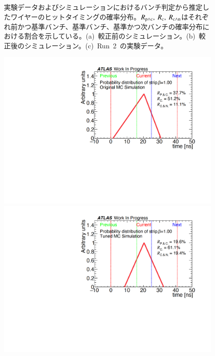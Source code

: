 \begin{figure}[H]
\begin{minipage}{0.33\hsize}
    \subcaption{}
    \end{minipage}
    \caption[実験データおよびシミュレーションにおけるバンチ判定から推定したワイヤーのヒットタイミングの確率分布]{実験データおよびシミュレーションにおけるバンチ判定から推定したワイヤーのヒットタイミングの確率分布。$R_{\rm{p{\land}c}},~R_{\rm{c}},~R_{\rm{c{\land}n}}$はそれぞれ前かつ基準バンチ、基準バンチ、基準かつ次バンチの確率分布における割合を示している。(a)~較正前のシミュレーション。(b)~較正後のシミュレーション。(c)~Run~2~の実験データ。}\label{fig:recall}
\end{figure}

\begin{figure}[H]
    \begin{minipage}{0.33\hsize}
    \centering   
    \includegraphics[width=\textwidth,page=1]{img/rec/rec_ori_s.pdf}
    \subcaption{}
    \end{minipage}
    \begin{minipage}{0.33\hsize}
    \centering   
    \includegraphics[width=\textwidth,page=1]{img/rec/rec_tune_s.pdf}

\end{minipage}
\end{figure}
